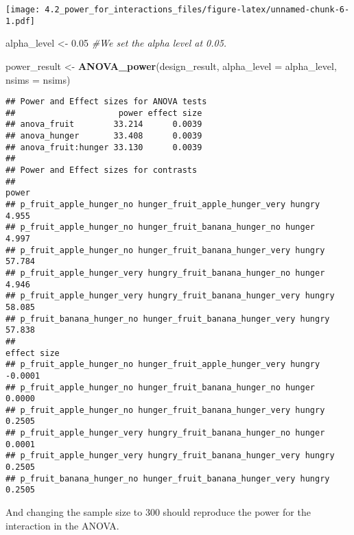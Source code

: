 \documentclass[]{article}
\newenvironment{Shaded}{\begin{snugshade}}{\end{snugshade}}
\newcommand{\KeywordTok}[1]{\textcolor[rgb]{0.13,0.29,0.53}{\textbf{#1}}}
\newcommand{\DataTypeTok}[1]{\textcolor[rgb]{0.13,0.29,0.53}{#1}}
\newcommand{\FloatTok}[1]{\textcolor[rgb]{0.00,0.00,0.81}{#1}}
\newcommand{\StringTok}[1]{\textcolor[rgb]{0.31,0.60,0.02}{#1}}
\newcommand{\CommentTok}[1]{\textcolor[rgb]{0.56,0.35,0.01}{\textit{#1}}}
\newcommand{\NormalTok}[1]{#1}
\begin{document}
\texttt{[image: 4.2\_power\_for\_interactions\_files/figure-latex/unnamed-chunk-6-1.pdf]}

\begin{Shaded}
\begin{Highlighting}[]
\NormalTok{alpha_level <-}\StringTok{ }\FloatTok{0.05} \CommentTok{#We set the alpha level at 0.05. }

\NormalTok{power_result <-}\StringTok{ }\KeywordTok{ANOVA_power}\NormalTok{(design_result, }\DataTypeTok{alpha_level =}\NormalTok{ alpha_level, }\DataTypeTok{nsims =}\NormalTok{ nsims)}
\end{Highlighting}
\end{Shaded}

\begin{verbatim}
## Power and Effect sizes for ANOVA tests
##                     power effect size
## anova_fruit        33.214      0.0039
## anova_hunger       33.408      0.0039
## anova_fruit:hunger 33.130      0.0039
## 
## Power and Effect sizes for contrasts
##                                                                   power
## p_fruit_apple_hunger_no hunger_fruit_apple_hunger_very hungry     4.955
## p_fruit_apple_hunger_no hunger_fruit_banana_hunger_no hunger      4.997
## p_fruit_apple_hunger_no hunger_fruit_banana_hunger_very hungry   57.784
## p_fruit_apple_hunger_very hungry_fruit_banana_hunger_no hunger    4.946
## p_fruit_apple_hunger_very hungry_fruit_banana_hunger_very hungry 58.085
## p_fruit_banana_hunger_no hunger_fruit_banana_hunger_very hungry  57.838
##                                                                  effect size
## p_fruit_apple_hunger_no hunger_fruit_apple_hunger_very hungry        -0.0001
## p_fruit_apple_hunger_no hunger_fruit_banana_hunger_no hunger          0.0000
## p_fruit_apple_hunger_no hunger_fruit_banana_hunger_very hungry        0.2505
## p_fruit_apple_hunger_very hungry_fruit_banana_hunger_no hunger        0.0001
## p_fruit_apple_hunger_very hungry_fruit_banana_hunger_very hungry      0.2505
## p_fruit_banana_hunger_no hunger_fruit_banana_hunger_very hungry       0.2505
\end{verbatim}

And changing the sample size to 300 should reproduce the power for the
interaction in the ANOVA.
\end{document}

